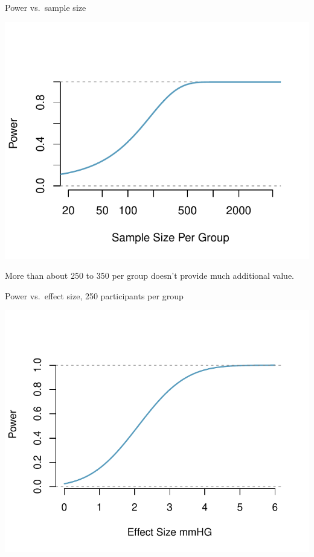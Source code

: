 \documentclass[ignorenonframetext,]{beamer}
\begin{document}
\begin{frame}{Power vs.~sample size}
\protect\hypertarget{power-vs.sample-size}{}

\small

\includegraphics{med_student_2019_files/figure-beamer/power_sample-1.pdf}

More than about 250 to 350 per group doesn't provide much additional
value.

\end{frame}

\begin{frame}{Power vs.~effect size, 250 participants per group}
\protect\hypertarget{power-vs.effect-size-250-participants-per-group}{}

\includegraphics{med_student_2019_files/figure-beamer/power_effect-1.pdf}

\end{frame}
\end{document}
